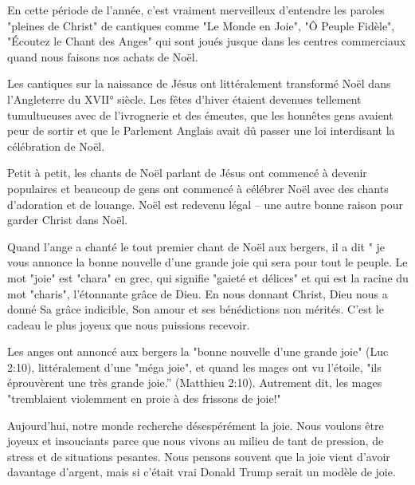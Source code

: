 


En cette période de l'année, c'est vraiment merveilleux d'entendre les paroles "pleines de Christ" de cantiques comme "Le Monde en Joie", "Ô Peuple Fidèle", "Écoutez le Chant des Anges" qui sont joués jusque dans les centres commerciaux quand nous faisons nos achats de Noël.

Les cantiques sur la naissance de Jésus ont littéralement transformé Noël dans l'Angleterre du XVII° siècle. Les fêtes d'hiver étaient devenues tellement tumultueuses avec de l'ivrognerie et des émeutes, que les honnêtes gens avaient peur de sortir et que le Parlement Anglais avait dû passer une loi interdisant la célébration de Noël.

Petit à petit, les chants de Noël parlant de Jésus ont commencé à devenir populaires et beaucoup de gens ont commencé à célébrer Noël avec des chants d'adoration et de louange. Noël est redevenu légal – une autre bonne raison pour garder Christ dans Noël.

Quand l'ange a chanté le tout premier chant de Noël aux bergers, il a dit " je vous annonce la bonne nouvelle d’une grande joie qui sera pour tout le peuple. Le mot "joie" est "chara" en grec, qui signifie "gaieté et délices" et qui est la racine du mot "charis", l'étonnante grâce de Dieu. En nous donnant Christ, Dieu nous a donné Sa grâce indicible, Son amour et ses bénédictions non mérités. C'est le cadeau le plus joyeux que nous puissions recevoir.

Les anges ont annoncé aux bergers la "bonne nouvelle d'une grande joie" (Luc 2:10), littéralement d'une "méga joie", et quand les mages ont vu l'étoile, "ils éprouvèrent une très grande joie.” (Matthieu 2:10). Autrement dit, les mages "tremblaient violemment en proie à des frissons de joie!"

Aujourd'hui, notre monde recherche désespérément la joie. Nous voulons être joyeux et insouciants parce que nous vivons au milieu de tant de pression, de stress et de situations pesantes. Nous pensons souvent que la joie vient d'avoir davantage d'argent, mais si c'était vrai Donald Trump serait un modèle de joie.

